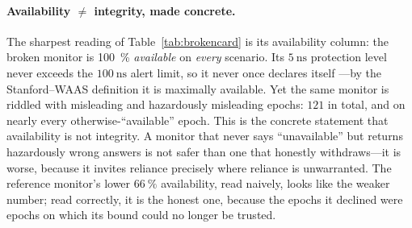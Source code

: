 \paragraph{Availability $\neq$ integrity, made concrete.} The sharpest reading of
Table~\ref{tab:brokencard} is its availability column: the broken monitor is
\SI{100}{\percent} \emph{available} on \emph{every} scenario. Its
$\SI{5}{\nano\second}$ protection level never exceeds the $\SI{100}{\nano\second}$
alert limit, so it never once declares itself \Unavail{}---by the Stanford--WAAS
definition it is maximally available. Yet the same monitor is riddled with
misleading and hazardously misleading epochs: $121$ \HMI{} in total, and \MI{} on
nearly every otherwise-``available'' epoch. This is the concrete statement that
availability is not integrity. A monitor that never says ``unavailable'' but returns
hazardously wrong answers is not safer than one that honestly withdraws---it is
worse, because it invites reliance precisely where reliance is unwarranted. The
reference monitor's lower $\SI{66}{\percent}$ availability, read naively, looks like
the weaker number; read correctly, it is the honest one, because the epochs it
declined were epochs on which its bound could no longer be trusted.

